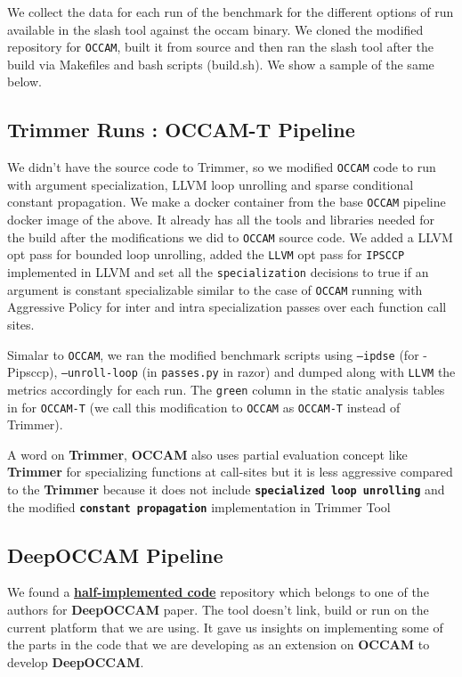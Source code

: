 \documentclass{relatorio}
\begin{document}
We collect the data for each run of the benchmark for the different options of run available in the slash tool against the occam binary. We cloned the modified repository for \texttt{OCCAM}, built it from source and then ran the slash tool after the build via Makefiles and bash scripts (build.sh). We show a sample of the same below. 

\subsection{Trimmer Runs : OCCAM-T Pipeline}%
\label{Tools}

We didn't have the source code to Trimmer, so we modified \texttt{OCCAM} code to run with argument specialization, LLVM loop unrolling and sparse conditional constant propagation. 
We make a docker container from the base \texttt{OCCAM} pipeline docker image of the above. It already has all the tools and libraries needed for the build after the modifications we did to \texttt{OCCAM} source code. We added a LLVM opt pass for bounded loop unrolling, added the \texttt{LLVM} opt pass for \texttt{IPSCCP} implemented in LLVM and set all the \texttt{specialization} decisions to true if an argument is constant specializable similar to the case of \texttt{OCCAM} running with Aggressive Policy for inter and intra specialization passes over each function call sites. 

Simalar to \texttt{OCCAM}, we ran the modified benchmark scripts using \texttt{--ipdse} (for -Pipsccp), \texttt{--unroll-loop} (in \texttt{passes.py} in razor) and dumped along with \texttt{LLVM} the metrics accordingly for each run. The \texttt{green} column in the static analysis tables in for \texttt{OCCAM-T} (we call this modification to \texttt{OCCAM} as \texttt{OCCAM-T} instead of Trimmer).

A word on \textbf{Trimmer}, \textbf{OCCAM} also uses partial evaluation concept like \textbf{Trimmer} for specializing functions at call-sites but it is less aggressive compared to the  \textbf{Trimmer} because it does not include \textbf{\texttt{specialized loop unrolling}} and the modified \textbf{\texttt{constant propagation}} implementation in Trimmer Tool

\subsection{DeepOCCAM Pipeline}%
\label{Tools}

We found a \textbf{\href{https://github.com/nhamlv-55/OCCAM/tree/mlpolicy}{half-implemented code}} repository which belongs to one of the authors for \textbf{DeepOCCAM} paper. The tool doesn't link, build or run on the current platform that we are using. It gave us insights on implementing some of the parts in the code that we are developing as an extension on \textbf{OCCAM} to develop \textbf{DeepOCCAM}.
\end{document}
